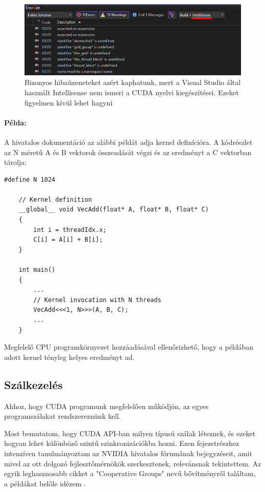 \begin{figure}[ht!]
	\centering
	\includegraphics[width=150mm, keepaspectratio] {figures/invalidIntellisenseErrorMessages.png}
	\caption{Bizonyos hibaüzeneteket azért kaphatunk, mert a Visual Studio által használt Intellisense nem ismeri a CUDA nyelvi kiegészítései. Ezeket figyelmen kívül lehet hagyni \label{invalidErrors} }
\end{figure}

\paragraph{Példa:} A hivatalos dokumentáció az alábbi példát adja kernel definícióra. A kódrészlet az N méretű A és B vektorok összeadását végzi és az eredményt a C vektorban tárolja:

\begin{lstlisting}[style=CStyle,showstringspaces=false]
	#define N 1024
	
	// Kernel definition
	__global__ void VecAdd(float* A, float* B, float* C)
	{
		int i = threadIdx.x;
		C[i] = A[i] + B[i];
	}
	
	int main()
	{
		...
		// Kernel invocation with N threads
		VecAdd<<<1, N>>>(A, B, C);
		...
	}
\end{lstlisting}

Megfelelő CPU programkörnyezet hozzáadásával ellenőrizhető, hogy a példában adott kernel tényleg helyes eredményt ad.

\subsection{Szálkezelés}
Ahhoz, hogy CUDA programunk megfelelően működjön, az egyes programszálakat rendszereznünk kell. 

Most bemutatom, hogy CUDA API-ban milyen típusú szálak léteznek, és ezeket hogyan lehet különböző szintű szinkronizációkba hozni. Ezen fejezetrészhez intenzíven tanulmányoztam az NVIDIA hivatalos fórumának bejegyzéseit, amit mivel az ott dolgozó fejlesztőmérnökök szerkesztenek, relevánsnak tekintettem. Az egyik leghasznosabb cikket a "Cooperative Groups" nevű bővítményről találtam, a példákat belőle idézem \cite{CUDAcoopgroups}.


